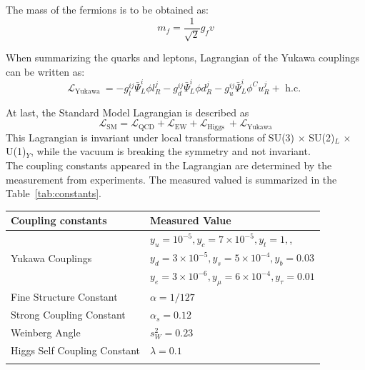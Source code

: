 The mass of the fermions is to be obtained as:
\begin{equation}
m_{f}=\frac{1}{\sqrt{2}} g_{f} v
\end{equation}

When summarizing the quarks and leptons, Lagrangian of the Yukawa couplings can be written as:
\begin{equation}
\mathcal{L}_{\text {Yukawa }}=-g_{l}^{i j} \bar{\Psi}_{L}^{i} \phi l_{R}^{j}-g_{d}^{i j} \bar{\Psi}_{L}^{i} \phi d_{R}^{j}-g_{u}^{i j} \bar{\Psi}_{L}^{i} \phi^{C} u_{R}^{j}+\text { h.c. }
\end{equation}

At last, the Standard Model Lagrangian is described as 
\begin{equation}
\mathcal{L}_{\mathrm{SM}}=\mathcal{L}_{\mathrm{QCD}}+\mathcal{L}_{\mathrm{EW}}+\mathcal{L}_{\text {Higgs }}+\mathcal{L}_{\text {Yukawa}}
\end{equation}
This Lagrangian is invariant under local transformations of SU(3) $\times$ SU(2)$_L$ $\times$ U(1)$_Y$, while the vacuum is breaking the symmetry and not invariant. \\

The coupling constants appeared in the Lagrangian are determined by the measurement from experiments. The measured valued is summarized in the Table~\ref{tab:constants}.  \\

\begin{center}
\begin{tabular}{|l|l|}
\hline
Coupling constants & Measured Value \\
\hline 
                             & $y_{u}=10^{-5}, y_{c}=7 \times 10^{-5}, y_{t}=1,$, \\
            Yukawa Couplings & $y_{d}=3 \times 10^{-5}, y_{s}=5 \times 10^{-4}, y_{b}=0.03$ \\
                             & $y_{e}=3 \times 10^{-6}, y_{\mu}=6 \times 10^{-4}, y_{\tau}=0.01$ \\
     Fine Structure Constant & $\alpha=1 / 127$ \\
    Strong Coupling Constant & $\alpha_{s}=0.12$ \\
              Weinberg Angle & $s_{W}^{2}=0.23$ \\
Higgs Self Coupling Constant & $\lambda=0.1$ \\
\hline
\label{tab:constants}
\caption{coupling constants~\cite{PhysRevD.98.030001}}
\end{tabular}
\end{center}

